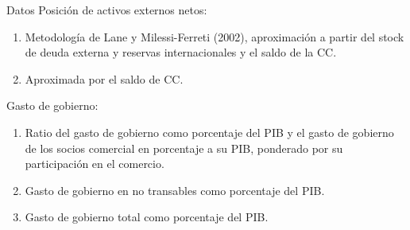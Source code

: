 \documentclass{beamer}
\begin{document}
\begin{frame}{Datos}
Posición de activos externos netos:
\begin{enumerate}
\item Metodología de Lane y Milessi-Ferreti (2002), aproximación a partir del stock de deuda externa y reservas internacionales y el saldo de la CC. 
\item Aproximada por el saldo de CC.
\end{enumerate}
Gasto de gobierno:
\begin{enumerate}
\item Ratio del gasto de gobierno como porcentaje del PIB y el gasto de gobierno de los socios comercial en porcentaje a su PIB, ponderado por su participación en el comercio. 
\item Gasto de gobierno en no transables como porcentaje del PIB. 
\item Gasto de gobierno total como porcentaje del PIB.   
\end{enumerate}
\end{frame}
\end{document}
